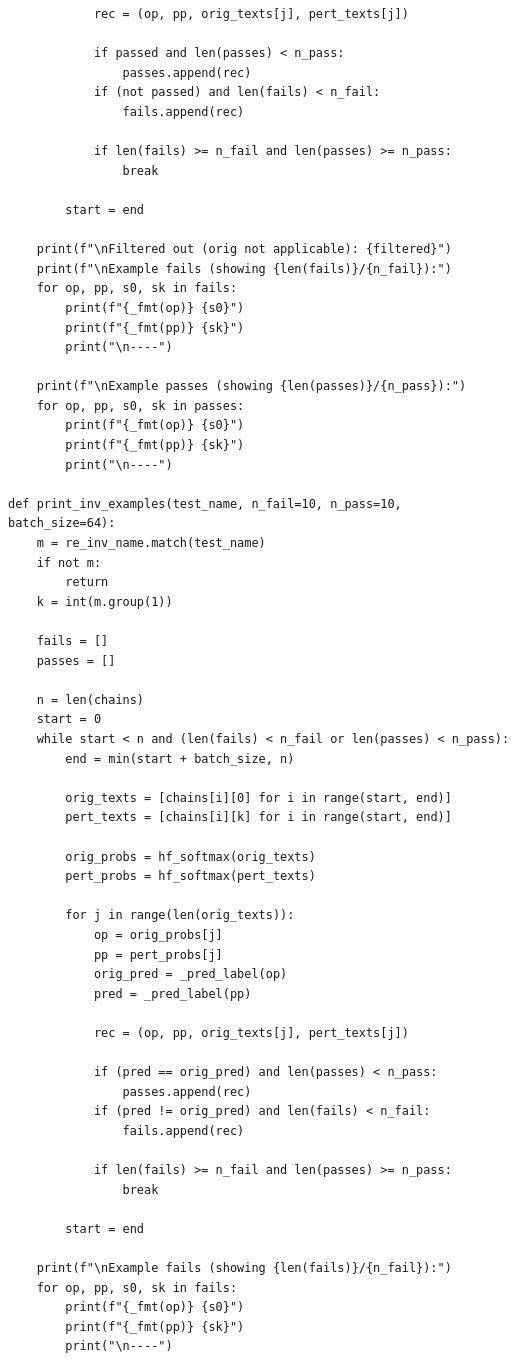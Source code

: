 \documentclass[11pt]{article}
\begin{document}
\begin{lstlisting}
            rec = (op, pp, orig_texts[j], pert_texts[j])

            if passed and len(passes) < n_pass:
                passes.append(rec)
            if (not passed) and len(fails) < n_fail:
                fails.append(rec)

            if len(fails) >= n_fail and len(passes) >= n_pass:
                break

        start = end

    print(f"\nFiltered out (orig not applicable): {filtered}")
    print(f"\nExample fails (showing {len(fails)}/{n_fail}):")
    for op, pp, s0, sk in fails:
        print(f"{_fmt(op)} {s0}")
        print(f"{_fmt(pp)} {sk}")
        print("\n----")

    print(f"\nExample passes (showing {len(passes)}/{n_pass}):")
    for op, pp, s0, sk in passes:
        print(f"{_fmt(op)} {s0}")
        print(f"{_fmt(pp)} {sk}")
        print("\n----")

def print_inv_examples(test_name, n_fail=10, n_pass=10, batch_size=64):
    m = re_inv_name.match(test_name)
    if not m:
        return
    k = int(m.group(1))

    fails = []
    passes = []

    n = len(chains)
    start = 0
    while start < n and (len(fails) < n_fail or len(passes) < n_pass):
        end = min(start + batch_size, n)

        orig_texts = [chains[i][0] for i in range(start, end)]
        pert_texts = [chains[i][k] for i in range(start, end)]

        orig_probs = hf_softmax(orig_texts)
        pert_probs = hf_softmax(pert_texts)

        for j in range(len(orig_texts)):
            op = orig_probs[j]
            pp = pert_probs[j]
            orig_pred = _pred_label(op)
            pred = _pred_label(pp)

            rec = (op, pp, orig_texts[j], pert_texts[j])

            if (pred == orig_pred) and len(passes) < n_pass:
                passes.append(rec)
            if (pred != orig_pred) and len(fails) < n_fail:
                fails.append(rec)

            if len(fails) >= n_fail and len(passes) >= n_pass:
                break

        start = end

    print(f"\nExample fails (showing {len(fails)}/{n_fail}):")
    for op, pp, s0, sk in fails:
        print(f"{_fmt(op)} {s0}")
        print(f"{_fmt(pp)} {sk}")
        print("\n----")


\end{lstlisting}
\end{document}
